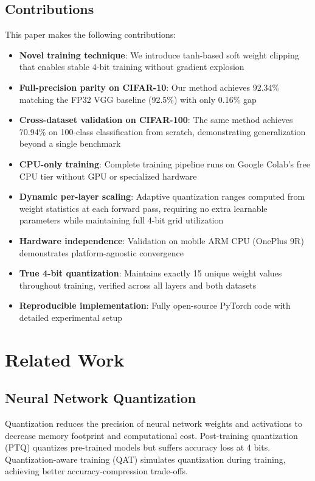 \documentclass[conference]{IEEEtran}
\begin{document}
\subsection{Contributions}
This paper makes the following contributions:
\begin{itemize}
    \item \textbf{Novel training technique}: We introduce tanh-based soft weight clipping that enables stable 4-bit training without gradient explosion

    \item \textbf{Full-precision parity on CIFAR-10}: Our method achieves 92.34\% matching the FP32 VGG baseline (92.5\%) with only 0.16\% gap

    \item \textbf{Cross-dataset validation on CIFAR-100}: The same method achieves 70.94\% on 100-class classification from scratch, demonstrating generalization beyond a single benchmark

    \item \textbf{CPU-only training}: Complete training pipeline runs on Google Colab's free CPU tier without GPU or specialized hardware

    \item \textbf{Dynamic per-layer scaling}: Adaptive quantization ranges computed from weight statistics at each forward pass, requiring no extra learnable parameters while maintaining full 4-bit grid utilization

    
    \item \textbf{Hardware independence}: Validation on mobile ARM CPU (OnePlus 9R) demonstrates platform-agnostic convergence

    \item \textbf{True 4-bit quantization}: Maintains exactly 15 unique weight values throughout training, verified across all layers and both datasets

    \item \textbf{Reproducible implementation}: Fully open-source PyTorch code with detailed experimental setup
\end{itemize}

\section{Related Work}

\subsection{Neural Network Quantization}
Quantization reduces the precision of neural network weights and activations to decrease memory footprint and computational cost. Post-training quantization (PTQ) \cite{nagel2019data, banner2019post} quantizes pre-trained models but suffers accuracy loss at 4 bits. Quantization-aware training (QAT) \cite{jacob2018quantization} simulates quantization during training, achieving better accuracy-compression trade-offs.
\end{document}
